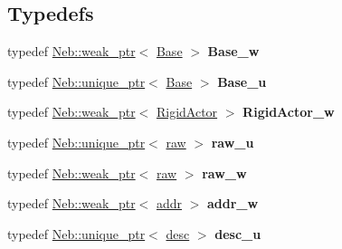 \subsection*{\-Typedefs}
{\bf }\par
\begin{DoxyCompactItemize}
\item 
\hypertarget{namespaceNeb_1_1Actor_aebecc9fc0c543f20fcffa4fa39fe7a7f}{typedef \hyperlink{classNeb_1_1weak__ptr}{\-Neb\-::weak\-\_\-ptr}$<$ \hyperlink{classNeb_1_1Actor_1_1Base}{\-Base} $>$ {\bfseries \-Base\-\_\-w}}\label{namespaceNeb_1_1Actor_aebecc9fc0c543f20fcffa4fa39fe7a7f}

\item 
\hypertarget{namespaceNeb_1_1Actor_a99beee505d795cd02efecf2b49fe5577}{typedef \hyperlink{classNeb_1_1unique__ptr}{\-Neb\-::unique\-\_\-ptr}$<$ \hyperlink{classNeb_1_1Actor_1_1Base}{\-Base} $>$ {\bfseries \-Base\-\_\-u}}\label{namespaceNeb_1_1Actor_a99beee505d795cd02efecf2b49fe5577}

\item 
\hypertarget{namespaceNeb_1_1Actor_a582f5119d9a59cbc1fa042196d01bb4e}{typedef \hyperlink{classNeb_1_1weak__ptr}{\-Neb\-::weak\-\_\-ptr}$<$ \hyperlink{classNeb_1_1Actor_1_1RigidActor}{\-Rigid\-Actor} $>$ {\bfseries \-Rigid\-Actor\-\_\-w}}\label{namespaceNeb_1_1Actor_a582f5119d9a59cbc1fa042196d01bb4e}

\item 
\hypertarget{namespaceNeb_1_1Actor_a91df606f415397d4d15cfc949f208792}{typedef \hyperlink{classNeb_1_1unique__ptr}{\-Neb\-::unique\-\_\-ptr}$<$ \hyperlink{classNeb_1_1Actor_1_1raw}{raw} $>$ {\bfseries raw\-\_\-u}}\label{namespaceNeb_1_1Actor_a91df606f415397d4d15cfc949f208792}

\item 
\hypertarget{namespaceNeb_1_1Actor_a6b47d877ea1ae0505306c281f65f30fa}{typedef \hyperlink{classNeb_1_1weak__ptr}{\-Neb\-::weak\-\_\-ptr}$<$ \hyperlink{classNeb_1_1Actor_1_1raw}{raw} $>$ {\bfseries raw\-\_\-w}}\label{namespaceNeb_1_1Actor_a6b47d877ea1ae0505306c281f65f30fa}

\item 
\hypertarget{namespaceNeb_1_1Actor_a0fbf0b60bc1e1a788cf928db172a7f42}{typedef \hyperlink{classNeb_1_1weak__ptr}{\-Neb\-::weak\-\_\-ptr}$<$ \hyperlink{classNeb_1_1Actor_1_1addr}{addr} $>$ {\bfseries addr\-\_\-w}}\label{namespaceNeb_1_1Actor_a0fbf0b60bc1e1a788cf928db172a7f42}

\item 
\hypertarget{namespaceNeb_1_1Actor_ab338b7005be7ed3e5284f25a3632bf35}{typedef \hyperlink{classNeb_1_1unique__ptr}{\-Neb\-::unique\-\_\-ptr}$<$ \hyperlink{classNeb_1_1Actor_1_1desc}{desc} $>$ {\bfseries desc\-\_\-u}}\label{namespaceNeb_1_1Actor_ab338b7005be7ed3e5284f25a3632bf35}


\end{DoxyCompactItemize}
